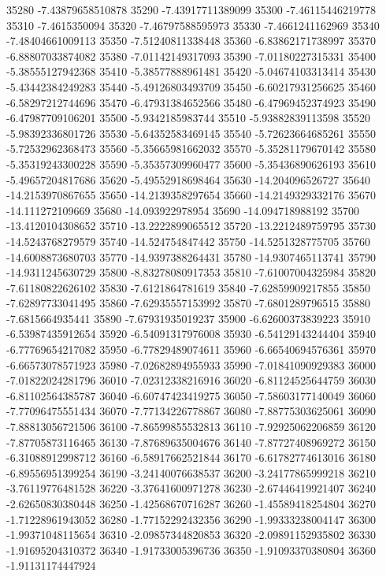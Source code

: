 {35280 -7.43879658510878
35290 -7.43917711389099
35300 -7.46115446219778
35310 -7.4615350094
35320 -7.46797588595973
35330 -7.4661241162969
35340 -7.48404661009113
35350 -7.51240811338448
35360 -6.83862171738997
35370 -6.88807033874082
35380 -7.01142149317093
35390 -7.01180227315331
35400 -5.38555127942368
35410 -5.38577888961481
35420 -5.04674103313414
35430 -5.43442384249283
35440 -5.49126803493709
35450 -6.60217931256625
35460 -6.58297212744696
35470 -6.47931384652566
35480 -6.47969452374923
35490 -6.47987709106201
35500 -5.9342185983744
35510 -5.93882839113598
35520 -5.98392336801726
35530 -5.64352583469145
35540 -5.72623664685261
35550 -5.72532962368473
35560 -5.35665981662032
35570 -5.35281179670142
35580 -5.35319243300228
35590 -5.35357309960477
35600 -5.35436890626193
35610 -5.49657204817686
35620 -5.49552918698464
35630 -14.204096526727
35640 -14.2153970867655
35650 -14.2139358297654
35660 -14.2149329332176
35670 -14.111272109669
35680 -14.093922978954
35690 -14.094718988192
35700 -13.4120104308652
35710 -13.2222899065512
35720 -13.2212489759795
35730 -14.5243768279579
35740 -14.524754847442
35750 -14.5251328775705
35760 -14.6008873680703
35770 -14.9397388264431
35780 -14.9307465113741
35790 -14.9311245630729
35800 -8.83278080917353
35810 -7.61007004325984
35820 -7.61180822626102
35830 -7.6121864781619
35840 -7.62859909217855
35850 -7.62897733041495
35860 -7.62935557153992
35870 -7.6801289796515
35880 -7.6815664935441
35890 -7.67931935019237
35900 -6.62600373839223
35910 -6.53987435912654
35920 -6.54091317976008
35930 -6.54129143244404
35940 -6.77769654217082
35950 -6.77829489074611
35960 -6.66540694576361
35970 -6.66573078571923
35980 -7.02682894955933
35990 -7.01841090929383
36000 -7.01822024281796
36010 -7.02312338216916
36020 -6.81124525644759
36030 -6.81102564385787
36040 -6.60747423419275
36050 -7.58603177140049
36060 -7.77096475551434
36070 -7.77134226778867
36080 -7.88775303625061
36090 -7.88813056721506
36100 -7.86599855532813
36110 -7.92925062206859
36120 -7.87705873116465
36130 -7.87689635004676
36140 -7.87727408969272
36150 -6.31088912998712
36160 -6.58917662521844
36170 -6.61782774613016
36180 -6.89556951399254
36190 -3.24140076638537
36200 -3.24177865999218
36210 -3.76119776481528
36220 -3.37641600971278
36230 -2.67446419921407
36240 -2.62650830380448
36250 -1.42568670716287
36260 -1.45589418254804
36270 -1.71228961943052
36280 -1.77152292432356
36290 -1.99333238004147
36300 -1.99371048115654
36310 -2.09857344820853
36320 -2.09891152935802
36330 -1.91695204310372
36340 -1.91733005396736
36350 -1.91093370380804
36360 -1.91131174447924
}
